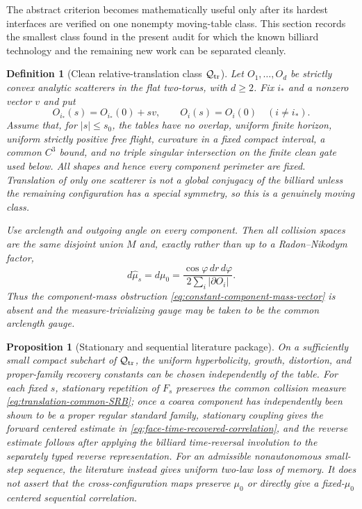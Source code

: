 \documentclass[11pt]{article}
\newtheorem{proposition}[theorem]{Proposition}
\newtheorem{definition}[theorem]{Definition}
\begin{document}
The abstract criterion becomes mathematically useful only after its hardest
interfaces are verified on one nonempty moving-table class.  This section
records the smallest class found in the present audit for which the known
billiard technology and the remaining new work can be separated cleanly.

\begin{definition}[Clean relative-translation class $\mathcal Q_{\rm tr}$]
\label{def:clean-relative-translation-class}
Let $O_1,\ldots,O_d$ be strictly convex analytic scatterers in the flat
two-torus, with $d\ge2$.  Fix $i_*$ and a nonzero vector $v$ and put
\begin{equation}
\label{eq:relative-translation-path}
 O_{i_*}(s)=O_{i_*}(0)+sv,\qquad O_i(s)=O_i(0)\quad(i\ne i_*).
\end{equation}
Assume that, for $|s|\le s_0$, the tables have no overlap, uniform finite
horizon, uniform strictly positive free flight, curvature in a fixed compact
interval, a common $C^3$ bound, and no triple singular intersection on the
finite clean gate used below.  All shapes and hence every component perimeter
are fixed.  Translation of only one scatterer is not a global conjugacy of
the billiard unless the remaining configuration has a special symmetry, so
this is a genuinely moving class.

Use arclength and outgoing angle on every component.  Then all collision
spaces are the same disjoint union $M$ and, exactly rather than up to a
Radon--Nikodym factor,
\begin{equation}
\label{eq:translation-common-SRB}
 d\widehat\mu_s=d\mu_0
 =\frac{\cos\varphi\,dr\,d\varphi}
        {2\sum_i|\partial O_i|}.
\end{equation}
Thus the component-mass obstruction
\eqref{eq:constant-component-mass-vector} is absent and the
measure-trivializing gauge may be taken to be the common arclength gauge.
\end{definition}

\begin{proposition}[Stationary and sequential literature package]
\label{prop:translation-literature-package}
On a sufficiently small compact subchart of $\mathcal Q_{\rm tr}$, the
uniform hyperbolicity, growth, distortion, and proper-family recovery
constants can be chosen independently of the table.  For each fixed $s$,
stationary repetition of $F_s$ preserves the common collision measure
\eqref{eq:translation-common-SRB}; once a coarea component has independently
been shown to be a proper regular standard family, stationary coupling gives
the forward centered estimate in
\eqref{eq:face-time-recovered-correlation}, and the reverse estimate follows
after applying the billiard time-reversal involution to the separately typed
reverse representation.  For an admissible nonautonomous small-step
sequence, the literature instead gives uniform two-law loss of memory.  It
does not assert that the cross-configuration maps preserve $\mu_0$ or
directly give a fixed-$\mu_0$ centered sequential correlation.
\end{proposition}
\end{document}
